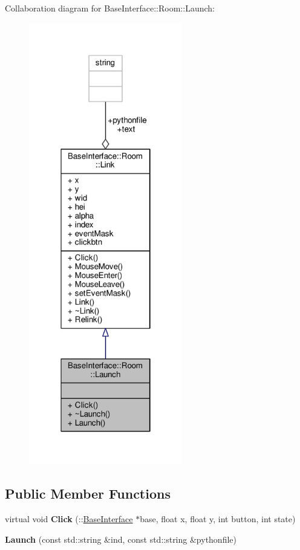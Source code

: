 Collaboration diagram for Base\+Interface\+:\+:Room\+:\+:Launch\+:
\nopagebreak
\begin{figure}[H]
\begin{center}
\leavevmode
\includegraphics[width=190pt]{db/d7b/classBaseInterface_1_1Room_1_1Launch__coll__graph}
\end{center}
\end{figure}
\subsection*{Public Member Functions}
\begin{DoxyCompactItemize}
\item 
virtual void {\bfseries Click} (\+::\hyperlink{classBaseInterface}{Base\+Interface} $\ast$base, float x, float y, int button, int state)\hypertarget{classBaseInterface_1_1Room_1_1Launch_a9070de133d64ce3059c40c902fba7faa}{}\label{classBaseInterface_1_1Room_1_1Launch_a9070de133d64ce3059c40c902fba7faa}

\item 
{\bfseries Launch} (const std\+::string \&ind, const std\+::string \&pythonfile)\hypertarget{classBaseInterface_1_1Room_1_1Launch_af4764c82de7bd5a14712d1ccfc1da561}{}\label{classBaseInterface_1_1Room_1_1Launch_af4764c82de7bd5a14712d1ccfc1da561}

\end{DoxyCompactItemize}
